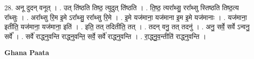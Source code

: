 \documentclass[17pt]{extarticle}
\begin{document}
28. अनू दुदन् वनूत् । . उत् ति॑ष्ठति तिष्ठ॒ त्युदुत् ति॑ष्ठति । . ति॒ष्ठ॒ त्यरा᳚थ्सु॒ ररा᳚थ्सु स्तिष्ठति तिष्ठ॒त्य रा᳚थ्सुः । . अरा᳚थ्सु रि॒म इ॒मे ऽरा᳚थ्सु॒ ररा᳚थ्सु रि॒मे । . इ॒मे यज॑माना॒ यज॑माना इ॒म इ॒मे यज॑मानाः । . यज॑माना॒ इतीति॒ यज॑माना॒ यज॑माना॒ इति॑ । . इति॒ तत् तदितीति॒ तत् । . तदन् वनु॒ तत् तदनु॑ । . अनु॒ सर्वे॒ सर्वे ऽन्वनु॒ सर्वे᳚ । . सर्वे॑ राद्ध्नुवन्ति राद्ध्नुवन्ति॒ सर्वे॒ सर्वे॑ राद्ध्नुवन्ति । . रा॒द्ध्नु॒व॒न्तीति॑ राद्ध्नुवन्ति । \newline

\textbf{Ghana Paata } \newline
\end{document}
